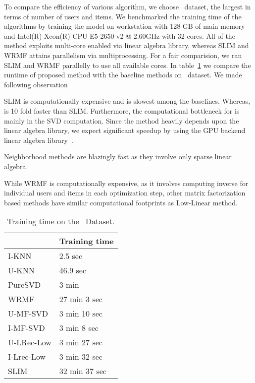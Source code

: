 
To compare the efficiency of various algorithm, we choose \Lowes\ dataset, the largest in terms of number of users and items. 
We benchmarked the training time of the algorithms 
by training the model on  workstation with 128 GB of main memory and Intel(R) Xeon(R) CPU E5-2650 v2 @ 2.60GHz with 32 cores. All of the method exploits multi-core enabled via linear algebra library, whereas SLIM and WRMF attains parallelism via multiprocessing. For a fair comparision, we ran  SLIM and WRMF parallelly to use all available cores.  In table~\ref{tbl:runtime_lowes} we compare the runtime of proposed method with the baseline methods on \Lowes\ dataset. We  made following observation
\begin{compactitem}
\item  SLIM is computationally expensive and is slowest among the baselines. Whereas, \LinearLow is 10 fold faster than SLIM. Furthermore, the computational bottleneck for \LinearLow is mainly in the SVD computation. Since the method heavily depends upon the linear algebra library, we expect significant speedup by using the GPU backend linear algebra library~\citep{Voronin:GPURSVD}. 
\item Neighborhood methods are blazingly fast as they involve only sparse linear algebra.
\item While WRMF is computationally expensive, as it involves computing inverse for individual users and items in each optimization step, other matrix factorization based methods have similar computational footprints as Low-Linear method.
\end{compactitem}

\begin{table}[!htb]
\centering
\caption{Training time on the  \Guitar\ Dataset.}
\label{tbl:runtime_lowes}
\begin{tabular}{l|l}
\hline
 & Training time \\
\hline
I-KNN & 2.5 sec \\ 
U-KNN & 46.9 sec \\
PureSVD & 3 min \\
WRMF & 27 min 3 sec \\
U-MF-SVD &  3 min 10 sec \\
I-MF-SVD & 3 min 8 sec \\ 
U-LRec-Low & 3 min 27 sec \\
I-Lrec-Low & 3 min 32 sec \\
SLIM  & 32 min 37 sec  \\
\hline
\end{tabular}
\end{table}